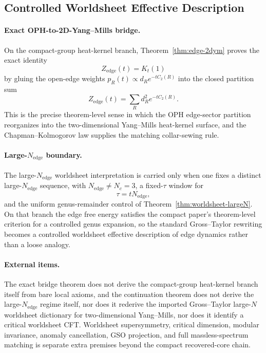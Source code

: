 \subsection{Controlled Worldsheet Effective Description}

\paragraph{Exact OPH-to-2D-Yang--Mills bridge.}
On the compact-group heat-kernel branch, Theorem~\ref{thm:edge-2dym} proves the exact identity
\[
Z_{\mathrm{edge}}(t)=K_t(1)
\]
by gluing the open-edge weights \(p_R(t)\propto d_R e^{-tC_2(R)}\) into the closed partition sum
\[
Z_{\mathrm{edge}}(t)=\sum_R d_R^2 e^{-tC_2(R)}.
\]
This is the precise theorem-level sense in which the OPH edge-sector partition reorganizes into
the two-dimensional Yang--Mills heat-kernel surface, and the Chapman--Kolmogorov law supplies the
matching collar-sewing rule.

\paragraph{Large-\(N_{\mathrm{edge}}\) boundary.}
The large-\(N_{\mathrm{edge}}\)
worldsheet interpretation is carried only when one fixes a distinct large-\(N_{\mathrm{edge}}\)
sequence, with \(N_{\mathrm{edge}}\neq N_c=3\), a fixed-\(\tau\) window for
\[
\tau=tN_{\mathrm{edge}},
\]
and the uniform genus-remainder control of Theorem~\ref{thm:worldsheet-largeN}. On that branch the
edge free energy satisfies the compact paper's theorem-level criterion for a controlled genus
expansion, so the standard Gross--Taylor rewriting becomes a controlled worldsheet effective
description of edge dynamics rather than a loose analogy.

\paragraph{External items.}
The exact bridge theorem does not derive the compact-group heat-kernel branch itself from bare
local axioms, and the continuation theorem does not derive the large-\(N_{\mathrm{edge}}\) regime
itself, nor does
it rederive the imported Gross--Taylor large-\(N\) worldsheet dictionary for two-dimensional
Yang--Mills, nor does it identify a critical worldsheet CFT. Worldsheet supersymmetry, critical
dimension, modular invariance, anomaly cancellation, GSO projection, and full massless-spectrum
matching is separate extra premises beyond the compact recovered-core chain.
